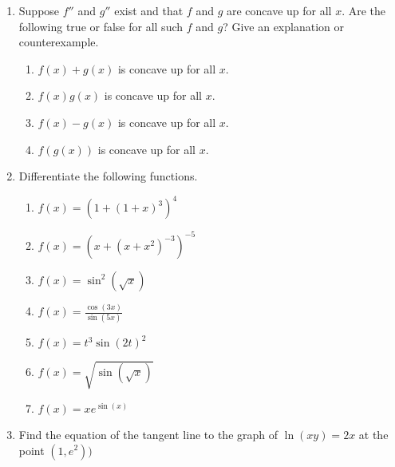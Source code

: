 \documentclass[11pt]{article}
\begin{document}
\begin{enumerate}
\item Suppose $f''$ and $g''$ exist and that $f$ and $g$ are concave
  up for all $x$. Are the following true or false for all such $f$ and
  $g$? Give an explanation or counterexample.
  \begin{enumerate}
  \item $f(x)+g(x)$ is concave up for all $x$.
  \item $f(x)g(x)$ is concave up for all $x$.
  \item $f(x)-g(x)$ is concave up for all $x$.
  \item $f(g(x))$ is concave up for all $x$.
  \end{enumerate}


\item Differentiate the following functions.
  \begin{enumerate}
  \item $f(x)=(1 + (1 + x)^{3})^{4}$
  \item $f(x)=(x+(x+x^{2})^{-3})^{-5}$
  \item $f(x)=\sin^2(\sqrt x)$
  \item $f(x)=\displaystyle{\frac{\cos(3x)}{\sin(5x)}}$
  \item $f(x)=t^{3} \sin(2t)^2$
  \item $f(x)=\sqrt {\sin(\sqrt{x})}$
  \item $f(x)=x e^{\sin(x)}$
  \end{enumerate}


\item Find the equation of the tangent line to the graph of $\ln(xy) =
  2x$ at the point $(1,e^{2}))$



\end{enumerate}
\end{document}
